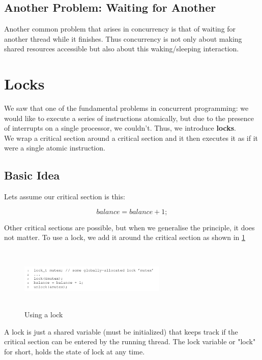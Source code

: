 \subsection{Another Problem: Waiting for Another}

Another common problem that arises in concurrency is that of waiting for
another thread while it finishes. Thus concurrency is not only about making
shared resources accessible but also about this waking/sleeping interaction.

\section{Locks}

We saw that one of the fundamental problems in concurrent programming: we would
like to execute a series of instructions atomically, but due to the presence of
interrupts on a single processor, we couldn't. Thus, we introduce \textbf{locks}.\\

We wrap a critical section around a critical section and it then executes it
as if it were a single atomic instruction.\\

\subsection{Basic Idea}

Lets assume our critical section is this:

$$
balance = balance + 1;
$$

Other critical sections are possible, but when we generalise the principle, it
does not matter. To use a lock, we add it around the critical section as shown
in \ref{lockinit}

\begin{figure}[h!]
    \label{lockinit}
    \begin{center}
        \includegraphics[width=7cm, height=3cm]{img/lockinit.png}
        \caption{Using a lock}
    \end{center}
\end{figure}

A lock is just a shared variable (must be initialized) that keeps track
if the critical section can be entered by the running thread. The lock variable
or "lock" for short, holds the state of lock at any time.\\

